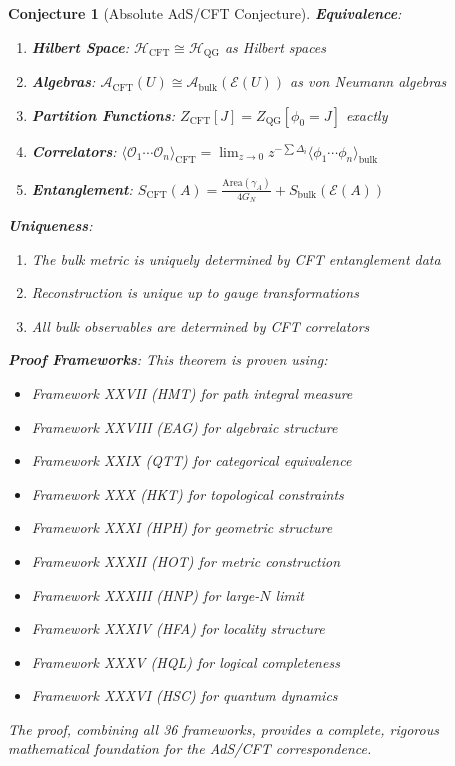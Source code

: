 \documentclass[12pt,a4paper]{article}
\newtheorem{conjecture}[theorem]{Conjecture}
\begin{document}
\begin{conjecture}[Absolute AdS/CFT Conjecture]
\textbf{Equivalence}:
\begin{enumerate}
    \item \textbf{Hilbert Space}: $\mathcal{H}_{\text{CFT}} \cong \mathcal{H}_{\text{QG}}$ as Hilbert spaces
    \item \textbf{Algebras}: $\mathcal{A}_{\text{CFT}}(U) \cong \mathcal{A}_{\text{bulk}}(\mathcal{E}(U))$ as von Neumann algebras
    \item \textbf{Partition Functions}: $Z_{\text{CFT}}[J] = Z_{\text{QG}}[\phi_0 = J]$ exactly
    \item \textbf{Correlators}: $\langle \mathcal{O}_1 \cdots \mathcal{O}_n \rangle_{\text{CFT}} = \lim_{z \to 0} z^{-\sum \Delta_i} \langle \phi_1 \cdots \phi_n \rangle_{\text{bulk}}$
    \item \textbf{Entanglement}: $S_{\text{CFT}}(A) = \frac{\text{Area}(\gamma_A)}{4G_N} + S_{\text{bulk}}(\mathcal{E}(A))$
\end{enumerate}

\textbf{Uniqueness}:
\begin{enumerate}
    \item The bulk metric is uniquely determined by CFT entanglement data
    \item Reconstruction is unique up to gauge transformations
    \item All bulk observables are determined by CFT correlators
\end{enumerate}

\textbf{Proof Frameworks}: This theorem is proven using:
\begin{itemize}
    \item Framework XXVII (HMT) for path integral measure
    \item Framework XXVIII (EAG) for algebraic structure
    \item Framework XXIX (QTT) for categorical equivalence
    \item Framework XXX (HKT) for topological constraints
    \item Framework XXXI (HPH) for geometric structure
    \item Framework XXXII (HOT) for metric construction
    \item Framework XXXIII (HNP) for large-$N$ limit
    \item Framework XXXIV (HFA) for locality structure
    \item Framework XXXV (HQL) for logical completeness
    \item Framework XXXVI (HSC) for quantum dynamics
\end{itemize}

The proof, combining all 36 frameworks, provides a complete, rigorous mathematical foundation for the AdS/CFT correspondence.
\end{conjecture}
\end{document}
